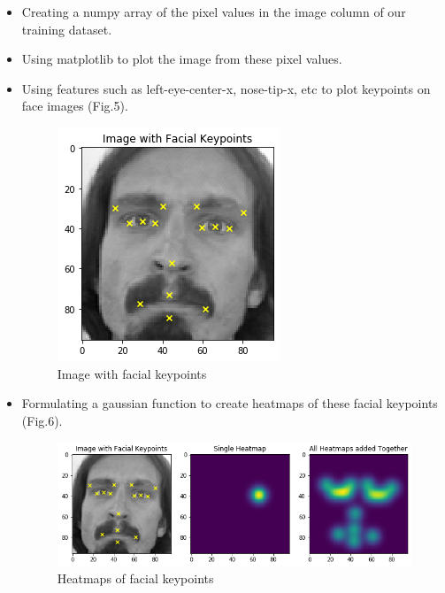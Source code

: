 \documentclass[conference]{IEEEtran}
\begin{document}
\begin{itemize}
    \item Creating a numpy array of the pixel values in the image column of our training dataset. 
    
    \item Using matplotlib to plot the image from these pixel values.
    
    \item Using features such as left-eye-center-x, nose-tip-x, etc to plot keypoints on face images (Fig.5).

\begin{figure}[h!]
    \centering
    \includegraphics[scale=0.8]{sample+keypoints.png}
    \caption{Image with facial keypoints}
    \label{fig:my_label}
\end{figure}

    \item Formulating a gaussian function to create heatmaps of these facial keypoints (Fig.6).
    
    
    
    
\begin{figure}[h!]
    \centering
    \includegraphics[scale=0.3]{sample+keypoints+heatmaps.png}
    \caption{Heatmaps of facial keypoints}
    \label{fig:my_label}
\end{figure}

\end{itemize}
\end{document}
